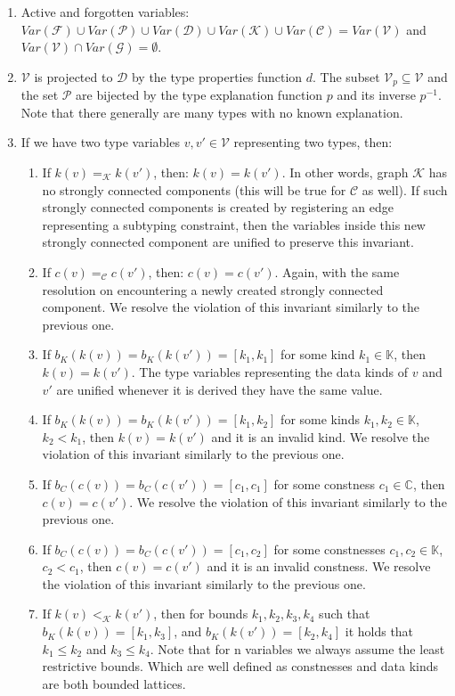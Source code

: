 \begin{enumerate}
    \item Active and forgotten variables: $Var(\mathcal{F}) \cup Var(\mathcal{P}) \cup Var(\mathcal{D}) \cup Var(\mathcal{K}) \cup Var(\mathcal{C}) = Var(\mathcal{V})$ and $Var(\mathcal{V}) \cap Var(\mathcal{G}) = \emptyset$. \label{invVar}

    \item $\mathcal{V}$ is projected to $\mathcal{D}$  by the type properties function $d$. The subset $\mathcal{V}_p \subseteq \mathcal{V}$ and the set $\mathcal{P}$ are bijected by the type explanation function $p$ and its inverse $p^{-1}$. Note that there generally are many types with no known explanation. \label{invPD}

    \item \label{invG} If we have two type variables $v, v' \in \mathcal{V}$ representing two types, then:
        \begin{enumerate}
            \item If $k (v) =_{\mathcal{K}} k (v')$, then: $k (v) = k(v')$. In other words, graph $\mathcal{K}$ has no strongly connected components (this will be true for $\mathcal{C}$ as well). If such strongly connected components is created by registering an edge representing a subtyping constraint, then the variables inside this new strongly connected component are unified to preserve this invariant.
            \item If $c (v) =_{\mathcal{C}} c (v')$, then: $c (v) = c(v')$. Again, with the same resolution on encountering a newly created strongly connected component. We resolve the violation of this invariant similarly to the previous one.
            \item If $b_K (k (v)) = b_K (k (v')) = [k_1, k_1]$ for some kind $k_1 \in \mathbb{K}$, then $k (v) = k (v')$. The type variables representing the data kinds of $v$ and $v'$ are unified whenever it is derived they have the same value.
            \item If $b_K (k (v)) = b_K (k (v')) = [k_1, k_2]$ for some kinds $k_1, k_2 \in \mathbb{K}$, $k_2 < k_1$, then $k (v) = k (v')$ and it is an invalid kind. We resolve the violation of this invariant similarly to the previous one.
            \item If $b_C (c (v)) = b_C (c (v')) = [c_1, c_1]$ for some constness $c_1 \in \mathbb{C}$, then $c (v) = c (v')$. We resolve the violation of this invariant similarly to the previous one.
            \item If $b_C (c (v)) = b_C (c (v')) = [c_1, c_2]$ for some constnesses $c_1, c_2 \in \mathbb{K}$, $c_2 < c_1$, then $c (v) = c (v')$ and it is an invalid constness. We resolve the violation of this invariant similarly to the previous one.
            \item If $k (v) <_{\mathcal{K}} k (v')$, then for bounds $k_1, k_2, k_3, k_4$ such that $b_K (k (v)) = [k_1, k_3]$, and $b_K (k (v')) = [k_2, k_4]$ it holds that $k_1 \leq k_2$ and $k_3 \leq k_4$. Note that for n variables we always assume the least restrictive bounds. Which are well defined as constnesses and data kinds are both bounded lattices.


\end{enumerate}
\end{enumerate}
